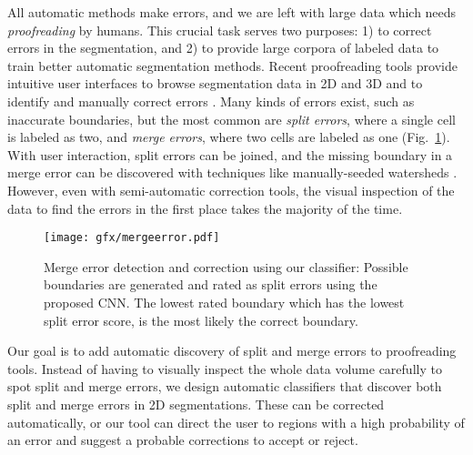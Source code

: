 All automatic methods make errors, and we are left with large data which needs \emph{proofreading} by humans. This crucial task serves two purposes: 1) to correct errors in the segmentation, and 2) to provide large corpora of labeled data to train better automatic segmentation methods. Recent proofreading tools provide intuitive user interfaces to browse segmentation data in 2D and 3D and to identify and manually correct errors \cite{markus_proofreading,raveler,mojo2,haehn_dojo_2014}. Many kinds of errors exist, such as inaccurate boundaries, but the most common are \emph{split errors}, where a single cell is labeled as two, and \emph{merge errors}, where two cells are labeled as one (Fig.~\ref{fig:merge_error}). With user interaction, split errors can be joined, and the missing boundary in a merge error can be discovered with techniques like manually-seeded watersheds \cite{haehn_dojo_2014}. However, even with semi-automatic correction tools, the visual inspection of the data to find the errors in the first place takes the majority of the time.

\begin{figure}[t]
\centering
\texttt{[image: gfx/mergeerror.pdf]}
\caption{ Merge error detection and correction using our classifier: Possible boundaries are generated and rated as split errors using the proposed CNN. The lowest rated boundary which has the lowest split error score, is the most likely the correct boundary.}
\label{fig:merge_error}
\end{figure}

Our goal is to add automatic discovery of split and merge errors to proofreading tools. Instead of having to visually inspect the whole data volume carefully to spot split and merge errors, we design automatic classifiers that discover both split and merge errors in 2D segmentations. These can be corrected automatically, or our tool can direct the user to regions with a high probability of an error and suggest a probable corrections to accept or reject.

